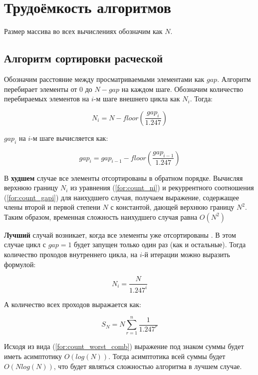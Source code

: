 \documentclass[12pt]{report}
\begin{document}
	\section{Трудоёмкость алгоритмов}

	Размер массива во всех вычислениях обозначим как $N$.

	\subsection{Алгоритм сортировки расческой}

	Обозначим расстояние между просматриваемыми элементами как $gap$. Алгоритм перебирает элементы от 0 до $N-gap$ на каждом шаге. Обозначим количество перебираемых элементов на $i$-м шаге внешнего цикла как $N_{i}$. Тогда:
	
	\begin{equation}
	\label{for:count_ni}
	N_{i} = N - floor(\frac{gap_{i}}{1.247})
	\end{equation}
	
	
	$gap_{i}$ на $i$-м шаге вычисляется как:
	
	
	\begin{equation}
	\label{for:count_gapi}
	gap_{i} = gap_{i-1} - floor(\frac{gap_{i-1}}{1.247})
	\end{equation}
	
	В \textbf{худшем} случае все элементы отсортированы в обратном порядке. Вычисляя верхнюю границу $N_{i}$ из уравнения (\ref{for:count_ni}) и рекуррентного соотношения (\ref{for:count_gapi}) для наихудшего случая, получаем выражение, содержащее члены второй и первой степени $N$ с константой, дающей верхнюю границу $N^2$. Таким образом, временная сложность наихудшего случая равна $O(N^2)$
	
	\textbf{Лучший} случай возникает, когда все элементы уже отсортированы . В этом случае цикл с $gap=1$ будет запущен только один раз (как и остальные). Тогда количество проходов внутреннего цикла, на $i$-й итерации можно выразить формулой:
	
	\begin{equation}
	N_{i}=\frac{N}{1.247^{i}}
	\end{equation}
	
	А количество всех проходов выражается как:

	\begin{equation}
	\label{for:count_worst_comb}
	S_{N}=N\sum_{r=1}^{n} \frac{1}{1.247^r}
	\end{equation}
	
	Исходя из вида (\ref{for:count_worst_comb}) выражение под знаком суммы будет иметь асимптотику $O(log(N))$. Тогда асимптотика всей суммы будет $O(Nlog(N))$, что будет являться сложностью алгоритма в лучшем случае.
	
\end{document}
